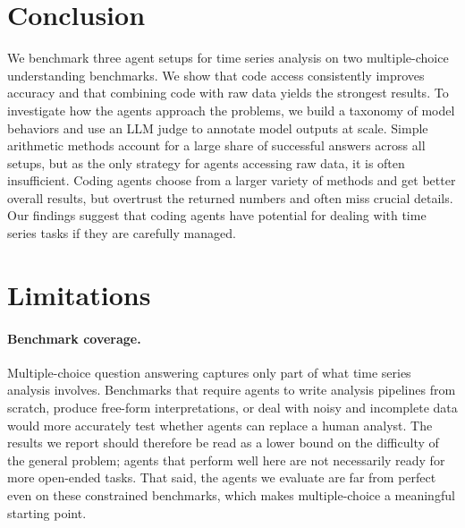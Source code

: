 \documentclass[11pt]{article}
\newcommand{\ljudge}{$\mathcal{L}_{\text{judge}}$}
\begin{document}
\begin{table}[ht!]
\centering\small
\setlength{\tabcolsep}{5pt}
\renewcommand{\arraystretch}{1.3}

\caption{Three annotated examples illustrating different failure modes identified by \ljudge{}. (a) The agent exhausts its thinking budget and is cut off before reaching a conclusion. (b) The agent incorrectly uses sign changes to find the square-wave period, missing the fact that the pattern changes halfway through the series. (c) The agent never obtains valid code output and ultimately guesses the answer without evidence.}
\label{tab:examples}
\end{table}

\section{Conclusion}

We benchmark three agent setups for time series analysis on two multiple-choice understanding benchmarks. We show that code access consistently improves accuracy and that combining code with raw data yields the strongest results. To investigate how the agents approach the problems, we build a taxonomy of model behaviors and use an LLM judge to annotate model outputs at scale. Simple arithmetic methods account for a large share of successful answers across all setups, but as the only strategy for agents accessing raw data, it is often insufficient. Coding agents choose from a larger variety of methods and get better overall results, but overtrust the returned numbers and often miss crucial details. Our findings suggest that coding agents have potential for dealing with time series tasks if they are carefully managed.


\section*{Limitations}

\paragraph{Benchmark coverage.}
Multiple-choice question answering captures only part of what time series analysis involves. Benchmarks that require agents to write analysis pipelines from scratch, produce free-form interpretations, or deal with noisy and incomplete data would more accurately test whether agents can replace a human analyst. The results we report should therefore be read as a lower bound on the difficulty of the general problem; agents that perform well here are not necessarily ready for more open-ended tasks. That said, the agents we evaluate are far from perfect even on these constrained benchmarks, which makes multiple-choice a meaningful starting point.
\end{document}
